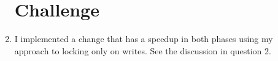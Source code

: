 \documentclass[psamsfonts]{amsart}
\begin{document}
\begin{enumerate}
    \section{Challenge}
  \item I implemented a change that has a speedup in both phases using my approach to locking only on writes. See the discussion in question 2.

\end{enumerate}
\end{document}
